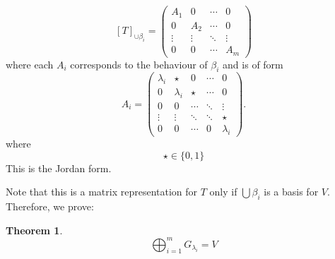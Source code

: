 \documentclass{article}
\theoremstyle{definition}
\newtheorem{theorem}{Theorem}[subsection]
\newcommand{\Gi}{G_{\lambda_i}}
\begin{document}
    \[
    [T]_{\cup \beta_i}=
    \begin{pmatrix}
    A_1 & 0   & \cdots & 0 \\
    0   & A_2 & \cdots & 0 \\
    \vdots & \vdots & \ddots & \vdots \\
    0   & 0   & \cdots & A_m
    \end{pmatrix}
    \]
    where each $A_i$ corresponds to the behaviour of $\beta_i$ and is of form
    \[
    A_i=
    \begin{pmatrix}
    \lambda_i & \star & 0 & \cdots & 0\\
    0 & \lambda_i & \star & \cdots & 0\\
    0 & 0 & \cdots & \ddots & \vdots\\
    \vdots & \vdots & \ddots & \ddots & \star\\
    
    0 & 0 & \cdots & 0 & \lambda_i
    \end{pmatrix}.
    \]
    where $$\star\in\{0,1\}$$
    This is the Jordan form.

    Note that this is a matrix representation for $T$ only if $\bigcup \beta_i$ is a basis for $V$. Therefore, we prove:
    \begin{theorem}
        $$\bigoplus_{i=1}^m \Gi = V$$
    \end{theorem}
\end{document}
